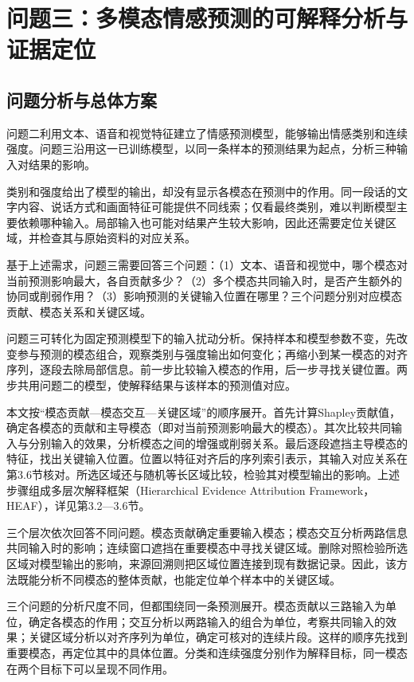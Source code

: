 \section{问题三：多模态情感预测的可解释分析与证据定位}\label{sec:q3}

\subsection{问题分析与总体方案}\label{subsec:q3_overview}
问题二利用文本、语音和视觉特征建立了情感预测模型，能够输出情感类别和连续强度。问题三沿用这一已训练模型，以同一条样本的预测结果为起点，分析三种输入对结果的影响。

类别和强度给出了模型的输出，却没有显示各模态在预测中的作用。同一段话的文字内容、说话方式和画面特征可能提供不同线索；仅看最终类别，难以判断模型主要依赖哪种输入。局部输入也可能对结果产生较大影响，因此还需要定位关键区域，并检查其与原始资料的对应关系。

基于上述需求，问题三需要回答三个问题：（1）文本、语音和视觉中，哪个模态对当前预测影响最大，各自贡献多少？（2）多个模态共同输入时，是否产生额外的协同或削弱作用？（3）影响预测的关键输入位置在哪里？三个问题分别对应模态贡献、模态关系和关键区域。

问题三可转化为固定预测模型下的输入扰动分析。保持样本和模型参数不变，先改变参与预测的模态组合，观察类别与强度输出如何变化；再缩小到某一模态的对齐序列，逐段去除局部信息。前一步比较输入模态的作用，后一步寻找关键位置。两步共用问题二的模型，使解释结果与该样本的预测值对应。

本文按“模态贡献—模态交互—关键区域”的顺序展开。首先计算Shapley贡献值，确定各模态的贡献和主导模态（即对当前预测影响最大的模态）。其次比较共同输入与分别输入的效果，分析模态之间的增强或削弱关系。最后逐段遮挡主导模态的特征，找出关键输入位置。位置以特征对齐后的序列索引表示，其输入对应关系在第3.6节核对。所选区域还与随机等长区域比较，检验其对模型输出的影响。上述步骤组成多层次解释框架（Hierarchical Evidence Attribution Framework，HEAF），详见第3.2—3.6节。

三个层次依次回答不同问题。模态贡献确定重要输入模态；模态交互分析两路信息共同输入时的影响；连续窗口遮挡在重要模态中寻找关键区域。删除对照检验所选区域对模型输出的影响，来源回溯则把区域位置连接到现有数据记录。因此，该方法既能分析不同模态的整体贡献，也能定位单个样本中的关键区域。

三个问题的分析尺度不同，但都围绕同一条预测展开。模态贡献以三路输入为单位，确定各模态的作用；交互分析以两路输入的组合为单位，考察共同输入的效果；关键区域分析以对齐序列为单位，确定可核对的连续片段。这样的顺序先找到重要模态，再定位其中的具体位置。分类和连续强度分别作为解释目标，同一模态在两个目标下可以呈现不同作用。

